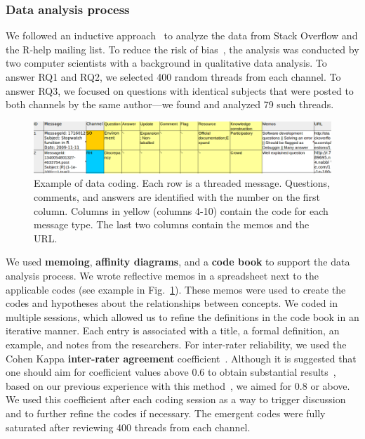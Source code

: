 \documentclass[smallextended]{svjour3}       %
\newcommand{\SO}{Stack Overflow\xspace}
\newcommand{\RH}{R-help\xspace}
\begin{document}
\subsubsection{Data analysis process}
\label{sec:dap}

We followed an inductive approach~\cite{Runeson2012} to analyze the data from \SO and the \RH mailing list. 
To reduce the risk of bias~\cite{Runeson2012}, the analysis was conducted by two computer scientists with a background in qualitative data analysis.
 To answer RQ1 and RQ2, we selected 400 random threads from each channel. To answer RQ3, we focused on questions with identical subjects that were posted to both channels by the same author---we found and analyzed 79 such threads.
    
    \begin{figure}[htbp]
    	\centering
    	\includegraphics[width=.95\textwidth]{../Figures/CodingExample}
    	\caption{Example of data coding. Each row is a threaded message. Questions, comments, and answers are identified with the number on the first column. Columns in yellow (columns 4-10) contain the code for each message type. The last two columns contain the memos and the URL.}
    	\label{fig:CodingExample}
    \end{figure}

We used \textbf{memoing}, \textbf{affinity diagrams}, and a \textbf{code book} to support the data analysis process. We wrote reflective memos in a spreadsheet next to the applicable codes (see example in Fig.~\ref{fig:CodingExample}). These memos were used to create the codes and hypotheses about the relationships between concepts. We coded in multiple sessions, which allowed us to refine the definitions in the code book 
in an iterative manner. Each entry is associated with a title, a formal definition, an example, and notes from the researchers. For inter-rater reliability, we used the Cohen Kappa \textbf{inter-rater agreement} coefficient~\cite{Stemler2004}. Although it is suggested that one should aim for coefficient values above 0.6 to obtain substantial results~\cite{Landis1977}, based on our previous experience with this method~\cite{Gomez2013}, we aimed for 0.8 or above. We used this coefficient after each coding session as a way to trigger discussion and to further refine the codes if necessary.  
The emergent codes were fully saturated after reviewing 400 threads from each channel. 
\end{document}
